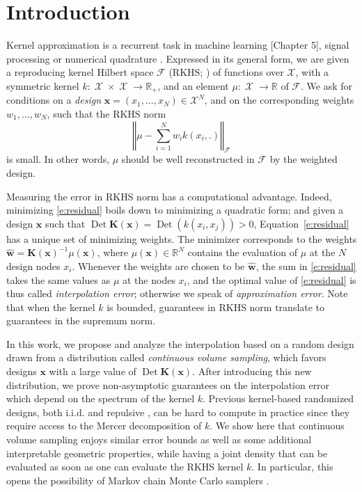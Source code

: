 \documentclass[twoside,11pt]{book}
\numberwithin{theorem}{chapter}
\numberwithin{definition}{chapter}
\numberwithin{proposition}{chapter}
\numberwithin{corollary}{chapter}
\numberwithin{example}{chapter}
\numberwithin{lemma}{chapter}
\DeclareMathOperator{\Det}{Det}
\DeclareMathOperator{\X}{\mathcal{X}}
\newcommand{\pc}[1]{\textcolor{blue}{#1}}
\begin{document}
\section{Introduction}
\label{CVS_sec:introduction}
Kernel approximation is a recurrent task in machine learning  \citep*{HaTiFr09}[Chapter 5], signal processing \citep{Uns00} or numerical quadrature \citep{Lar72}. Expressed in its general form, we are given a reproducing kernel Hilbert space $\mathcal{F}$ (RKHS; \citealp{BeTh11}) of functions over $\mathcal{X}$, with a symmetric kernel $k: \X \times \X \rightarrow \mathbb{R}_{+}$, and an element $\mu : \X \rightarrow \mathbb{R}$ of $\mathcal{F}$. We ask for conditions on a \emph{design} $\bm{x} = (x_{1},\dots,x_N)\in \mathcal{X}^N$, and on the corresponding weights $w_1,\dots,w_N$, such that the RKHS norm
\begin{equation}
\left\Vert \mu - \sum_{i=1}^N w_{i}k(x_{i},.)\right\Vert_{\mathcal{F}}
\label{CVS_e:residual}
\end{equation}
is small. In other words, $\mu$ should be well reconstructed in $\mathcal{F}$ by the weighted design.

Measuring the error in RKHS norm has a computational advantage. Indeed, minimizing \eqref{e:residual} boils down to minimizing a quadratic form; and given a design $\bm{x}$ such that $\Det \bm{K}(\bm{x}) = \Det (k(x_i,x_j)) >0$, Equation~\eqref{e:residual} has a unique set of minimizing weights. The minimizer corresponds to the weights $\hat{\bm{w}} = \bm{K}(\bm{x})^{-1} \mu(\bm{x})$, where $\mu(\bm{x})\in\mathbb{R}^N$ contains the evaluation of $\mu$ at the $N$ design nodes $x_{i}$. Whenever the weights are chosen to be $\hat{\bm{w}}$, the sum in \eqref{e:residual} takes the same values as $\mu$ at the nodes $x_{i}$, and the optimal value of \eqref{e:residual} is thus called \emph{interpolation error}; otherwise we speak of \emph{approximation error}.
Note that when the kernel $k$ is bounded, guarantees in RKHS norm translate to guarantees in the supremum norm.

In this work, we propose and analyze the interpolation based on a random design drawn from a distribution called \emph{continuous volume sampling}, which favors designs $\bm{x}$ with a large value of $\Det \bm{K}(\bm{x})$. After introducing this new distribution, we prove non-asymptotic guarantees on the interpolation error which depend on the spectrum of the kernel $k$. Previous kernel-based randomized designs, both i.i.d. \citep{Bac17} and repulsive \citep{BeBaCh19}, can be hard to compute in practice since they require access to the Mercer decomposition of $k$. We show here that continuous volume sampling enjoys similar error bounds as well as some additional interpretable geometric properties, while having a joint density that can be evaluated as soon as one can evaluate the RKHS kernel $k$. In particular, this opens the possibility of Markov chain Monte Carlo samplers \citep{ReGh19}.
\end{document}
